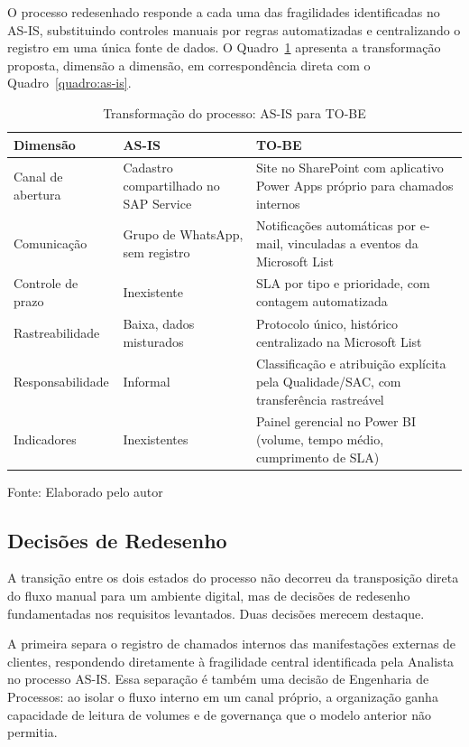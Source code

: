 O processo redesenhado responde a cada uma das fragilidades
identificadas no AS-IS, substituindo controles manuais por
regras automatizadas e centralizando o registro em uma única
fonte de dados. O Quadro~\ref{quadro:to-be} apresenta a
transformação proposta, dimensão a dimensão, em correspondência
direta com o Quadro~\ref{quadro:as-is}.

\begin{table}[H]
\caption{Transformação do processo: AS-IS para TO-BE}
\label{quadro:to-be}
\centering
\begin{tabular}{p{3.0cm} p{4.9cm} p{4.9cm}}
\hline
\textbf{Dimensão} & \textbf{AS-IS} & \textbf{TO-BE} \\
\hline
Canal de abertura & Cadastro compartilhado no SAP Service &
Site no SharePoint com aplicativo Power Apps próprio para
chamados internos \\
\hline
Comunicação & Grupo de WhatsApp, sem registro & Notificações
automáticas por e-mail, vinculadas a eventos da Microsoft
List \\
\hline
Controle de prazo & Inexistente & SLA por tipo e prioridade,
com contagem automatizada \\
\hline
Rastreabilidade & Baixa, dados misturados & Protocolo único,
histórico centralizado na Microsoft List \\
\hline
Responsabilidade & Informal & Classificação e atribuição
explícita pela Qualidade/SAC, com transferência rastreável \\
\hline
Indicadores & Inexistentes & Painel gerencial no Power BI
(volume, tempo médio, cumprimento de SLA) \\
\hline
\end{tabular}
\raggedright
\par
{\fontsize{10}{12}\selectfont Fonte: Elaborado pelo autor}
\end{table}

\subsection{Decisões de Redesenho}

A transição entre os dois estados do processo não decorreu da
transposição direta do fluxo manual para um ambiente digital,
mas de decisões de redesenho fundamentadas nos requisitos
levantados. Duas decisões merecem destaque.

A primeira separa o registro de chamados internos das
manifestações externas de clientes, respondendo diretamente à
fragilidade central identificada pela Analista no processo
AS-IS. Essa separação é também uma decisão de Engenharia de
Processos: ao isolar o fluxo interno em um canal próprio, a
organização ganha capacidade de leitura de volumes e de
governança que o modelo anterior não permitia.

